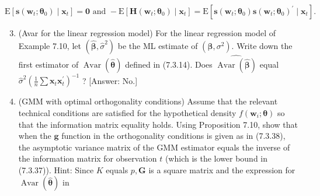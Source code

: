 \documentclass[10pt]{article}
\begin{document}
$$
\mathrm{E}\left[\mathbf{s}\left(\mathbf{w}_{t} ; \boldsymbol{\theta}_{0}\right) \mid \mathbf{x}_{t}\right]=\mathbf{0} \text { and }-\mathrm{E}\left[\mathbf{H}\left(\mathbf{w}_{t} ; \boldsymbol{\theta}_{0}\right) \mid \mathbf{x}_{t}\right]=\mathrm{E}\left[\mathbf{s}\left(\mathbf{w}_{t} ; \boldsymbol{\theta}_{0}\right) \mathbf{s}\left(\mathbf{w}_{t} ; \boldsymbol{\theta}_{0}\right)^{\prime} \mid \mathbf{x}_{t}\right] .
$$

\begin{enumerate}
  \setcounter{enumi}{2}
  \item (Avar for the linear regression model) For the linear regression model of Example 7.10, let $\left(\widehat{\boldsymbol{\beta}}, \hat{\sigma}^{2}\right)$ be the ML estimate of $\left(\boldsymbol{\beta}, \sigma^{2}\right)$. Write down the first estimator of $\operatorname{Avar}(\hat{\boldsymbol{\theta}})$ defined in (7.3.14). Does $\widehat{\operatorname{Avar}(\widehat{\boldsymbol{\beta}})}$ equal $\hat{\sigma}^{2}\left(\frac{1}{n} \sum \mathbf{x}_{t} \mathbf{x}_{t}^{\prime}\right)^{-1}$ ? [Answer: No.]
  \item (GMM with optimal orthogonality conditions) Assume that the relevant technical conditions are satisfied for the hypothetical density $f\left(\mathbf{w}_{i} ; \boldsymbol{\theta}\right)$ so that the information matrix equality holds. Using Proposition 7.10, show that when the $\mathbf{g}$ function in the orthogonality conditions is given as in (7.3.38), the asymptotic variance matrix of the GMM estimator equals the inverse of the information matrix for observation $t$ (which is the lower bound in (7.3.37)). Hint: Since $K$ equals $p, \mathbf{G}$ is a square matrix and the expression for $\operatorname{Avar}(\hat{\boldsymbol{\theta}})$ in
\end{enumerate}
\end{document}
